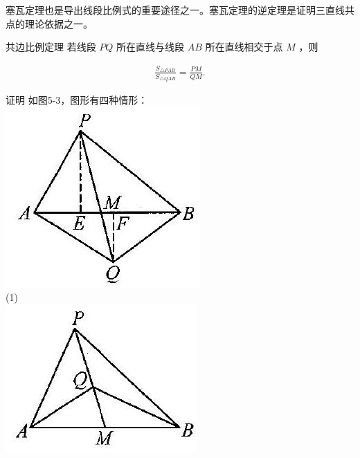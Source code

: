 \documentclass[10pt]{article}
\begin{document}
塞瓦定理也是导出线段比例式的重要途径之一。塞瓦定理的逆定理是证明三直线共点的理论依据之一。

共边比例定理 若线段 $P Q$ 所在直线与线段 $A B$ 所在直线相交于点 $M$ ，则

\begin{align*}
\frac{S_{\triangle P A B}}{S_{\triangle Q A B}}=\frac{P M}{Q M} . \tag{5-5}
\end{align*}

证明 如图5-3，图形有四种情形：\\
\includegraphics[max width=\textwidth, center]{2024_10_30_2c8f45efd4a519b08e1ag-048(3)}\\
(1)\\
\includegraphics[max width=\textwidth, center]{2024_10_30_2c8f45efd4a519b08e1ag-048}\\
\end{document}

